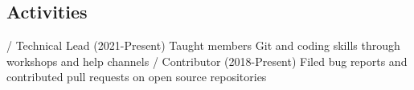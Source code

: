 \begin{outline}
\0 \section{Activities}
     / Technical Lead (2021-Present)
        \2 Taught members Git and coding skills through workshops and help channels
     / Contributor (2018-Present)
        \2 Filed bug reports and contributed pull requests on open source repositories

\end{outline}
